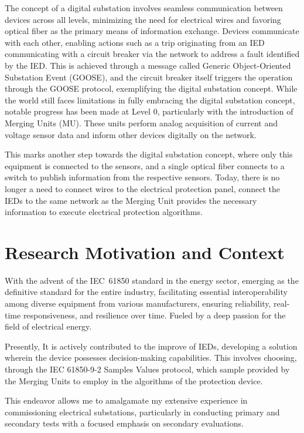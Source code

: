 The concept of a digital substation involves seamless communication between devices across all levels, minimizing the need for electrical wires and favoring optical fiber as the primary means of information exchange. Devices communicate with each other, enabling actions such as a trip originating from an IED communicating with a circuit breaker via the network to address a fault identified by the IED. This is achieved through a message called Generic Object-Oriented Substation Event (GOOSE), and the circuit breaker itself triggers the operation through the GOOSE protocol, exemplifying the digital substation concept. While the world still faces limitations in fully embracing the digital substation concept, notable progress has been made at Level 0, particularly with the introduction of Merging Units (MU). These units perform analog acquisition of current and voltage sensor data and inform other devices digitally on the network.

This marks another step towards the digital substation concept, where only this equipment is connected to the sensors, and a single optical fiber connects to a switch to publish information from the respective sensors. Today, there is no longer a need to connect wires to the electrical protection panel, connect the IEDs to the same network as the Merging Unit provides the necessary information to execute electrical protection algorithms.

\section{Research Motivation and Context}
With the advent of the IEC~61850 standard in the energy sector, emerging as the definitive standard for the entire industry, facilitating essential interoperability among diverse equipment from various manufacturers, ensuring reliability, real-time responsiveness, and resilience over time. Fueled by a deep passion for the field of electrical energy.

Presently, It is actively contributed to the improve of IEDs, developing a solution wherein the device possesses decision-making capabilities. This involves choosing, through the IEC 61850-9-2 Samples Values protocol, which sample provided by the Merging Units to employ in the algorithms of the protection device.

This endeavor allows me to amalgamate my extensive experience in commissioning electrical substations, particularly in conducting primary and secondary tests with a focused emphasis on secondary evaluations.

